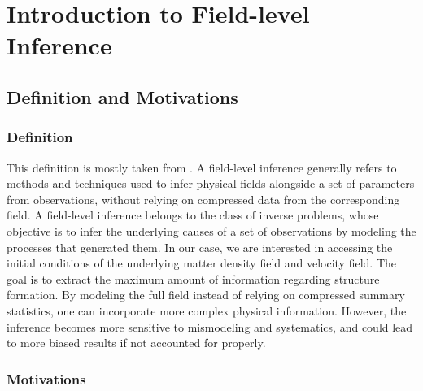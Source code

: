 \section{Introduction to Field-level Inference}
\subsection{Definition and Motivations}

\subsubsection{Definition}

This definition is mostly taken from \cite{Leclercq_2025}. A field-level inference generally refers to methods and techniques used to infer 
physical fields alongside a set of parameters from observations, without relying on compressed data from the corresponding field. 
A field-level inference belongs to the class of inverse problems, whose objective is to infer the underlying causes of a set of observations by modeling the processes 
that generated them. In our case, we are interested in accessing the initial conditions of the underlying matter density field and velocity field. The goal is 
to extract the maximum amount of information regarding structure formation. 
By modeling the full field instead of relying on compressed summary 
statistics, one can incorporate more complex physical information. However, the inference becomes more sensitive to mismodeling and systematics, and could lead to more biased 
results if not accounted for properly.

\subsubsection{Motivations}

